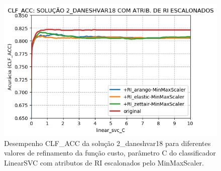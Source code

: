 \begin{figure}[h]
    \centering
    \caption{Desempenho CLF\_ACC da solução 2\_daneshvar18 para diferentes valores de refinamento da função custo, parâmetro C do classificador LinearSVC com atributos de RI escalonados pelo MinMaxScaler.}
    \vspace{-0.5cm}
    \begin{center}
        \includegraphics[scale=0.75]{img/clf-acc-2-daneshvar18-ir-scaled.png}
    \end{center}
    \vspace{-0.5cm}
    \label{fig:clf-acc-2-daneshvar18-ir-scaled}
\end{figure}